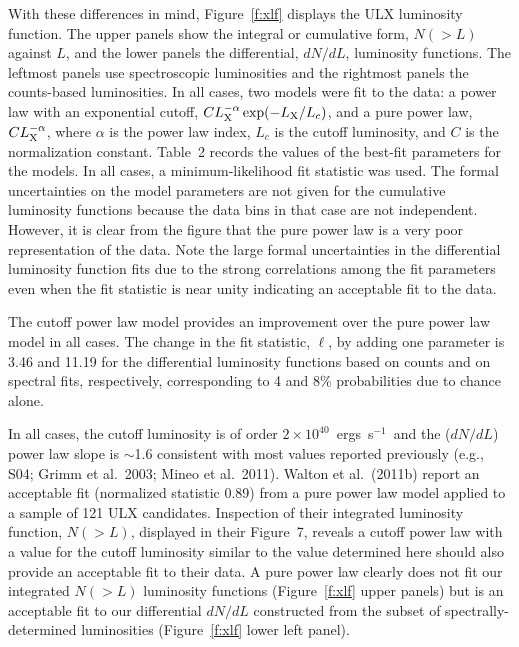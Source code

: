\documentclass{article}
\newcommand{\ergl}{ergs~s$^{-1}$}
\newcommand{\etal}{et al.}
\begin{document}
 
With these differences in mind, Figure~\ref{f:xlf} displays the ULX luminosity function. 
The upper panels show the integral or cumulative form, $N(>L)$ against $L$, 
 and the lower panels the differential, $dN/dL$, luminosity functions.
The leftmost panels use spectroscopic luminosities and the rightmost panels
 the counts-based luminosities.
In all cases, two models were fit to the data:
a power law with an exponential cutoff, $C L_{\rm X}^{-\alpha} \exp(-L_{\rm X}/L_{c})$,
and a 
pure power law, $C L_{\rm X}^{-\alpha}$,
 where $\alpha$ is the power law index, $L_{c}$ is the cutoff luminosity, and $C$ is the normalization constant.
Table~2 records the values of the best-fit parameters for the models.
In all cases, a minimum-likelihood fit statistic was used.
The formal uncertainties on the model parameters 
 are not given for the cumulative luminosity functions because the data bins in that case
 are not independent.
However, it is clear from the figure that the pure power law is a very poor representation of the data.
Note the large formal uncertainties in the differential luminosity function fits
 due to the strong correlations among the fit parameters even when the fit statistic is near unity
 indicating an acceptable fit to the data.

The cutoff power law model provides an improvement over the pure power law model in all cases.
The change in the fit statistic, $\ell$, by adding one parameter is 3.46 and 11.19 for the differential 
 luminosity functions based on counts and on spectral fits, respectively, corresponding to 
 4 and 8\% probabilities due to chance alone.

In all cases, the cutoff luminosity is of order $2\times 10^{40}$~\ergl\ and the 
 ($dN/dL$) power law slope is  $\sim$1.6 
 consistent with most values reported previously (e.g., S04; Grimm \etal\ 2003;
 Mineo \etal\ 2011).
Walton \etal\ (2011b) report an acceptable fit (normalized statistic 0.89) from a pure power 
law model applied to a sample of 121 ULX candidates. 
Inspection of their integrated luminosity function, $N(>L)$, displayed in their Figure~7,
 reveals a cutoff power law with a value for the cutoff luminosity similar to the 
 value determined here should also provide an acceptable fit to their data.
A pure power law clearly does not fit our integrated $N(>L)$ luminosity functions 
 (Figure~\ref{f:xlf} upper panels) but is an 
 acceptable fit to our differential $dN/dL$ constructed from the 
 subset of spectrally-determined luminosities
 (Figure~\ref{f:xlf} lower left panel).
 
\end{document}
